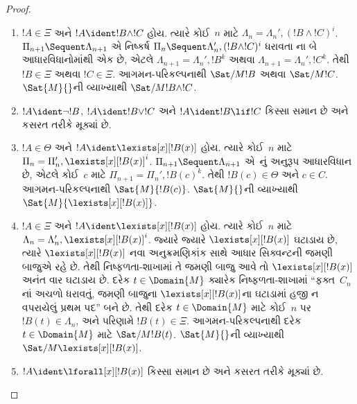 \begin{proof}
\begin{enumerate}
  \item $!A \in \Xi$
  અને
  $!A \ident !B \land !C$
  હોય. ત્યારે
  કોઈ~$n$ માટે
  $\Lambda_n = \Lambda_n', (!B \land !C)^i$.
  $\Pi_{n+1} \Sequent
  \Lambda_{n+1}$
  એ નિષ્કર્ષ
  $\Pi_n \Sequent \Lambda'_n, (!B \land !C)^i$
  ધરાવતા
  \RightR{\land}ના
  બે આધારવિધાનોમાંથી
  એક છે, એટલે
  $\Lambda_{n+1} = \Lambda_n', !B^k$
  અથવા
  $\Lambda_{n+1} = \Lambda_n',
  !C^k$.
  તેથી
  $!B \in \Xi$
  અથવા
  $!C \in \Xi$.
  આગમન-પરિકલ્પનાથી
  $\Sat/{M}{!B}$
  અથવા
  $\Sat/{M}{!C}$.
  $\Sat{M}{}$ની
  વ્યાખ્યાથી
  $\Sat/{M}{!B \land !C}$.
  
  \item
  $!A \ident \lnot !B$,
  $!A \ident !B \lor !C$
  અને
  $!A \ident !B \lif !C$
  કિસ્સા સમાન
  છે અને
  કસરત તરીકે
  મૂક્યાં છે.

  \item $!A \in \Theta$
  અને
  $!A \ident \lexists[x][!B(x)]$
  હોય. ત્યારે
  કોઈ~$n$ માટે
  $\Pi_n = \Pi_n', \lexists[x][!B(x)]^i$.
  $\Pi_{n+1}
  \Sequent \Lambda_{n+1}$
  એ~\LeftR{\lexists}નું
  અનુરૂપ
  આધારવિધાન
  છે, એટલે
  કોઈ~$c$ માટે
  $\Pi_{n+1} = \Pi_n', !B(c)^k$.
  તેથી
  $!B(c) \in \Theta$
  અને
  $c \in C$.
  આગમન-પરિકલ્પનાથી
  $\Sat{M}{!B(c)}$.
  $\Sat{M}{}$ની
  વ્યાખ્યાથી
  $\Sat{M}{\lexists[x][!B(x)]}$.

  \item $!A \in \Xi$
  અને
  $!A \ident \lexists[x][!B(x)]$
  હોય. ત્યારે
  કોઈ~$n$ માટે
  $\Lambda_n = \Lambda_n', \lexists[x][!B(x)]^i$.
  જ્યારે જ્યારે
  $\lexists[x][!B(x)]$
  ઘટાડાય છે,
  ત્યારે
  $\lexists[x][!B(x)]$
  નવા અનુક્રમણિકાંક
  સાથે આધાર
  સિક્વન્ટની
  જમણી બાજુએ
  રહે છે.
  તેથી નિષ્ફળતા-શાખામાં
  તે જમણી બાજુ
  આવે તો
  $\lexists[x][!B(x)]$
  અનંત વાર
  ઘટાડાય છે.
  દરેક
  $t \in
  \Domain{M}$
  ક્યારેક
  નિષ્ફળતા-શાખામાં
  ``ફક્ત~$C_n$નાં
  અચળો ધરાવતું,
  જમણી બાજુના
  $\lexists[x][!B(x)]$ના
  ઘટાડામાં હજી
  ન વપરાયેલું
  પ્રથમ પદ''
  બને છે.
  તેથી દરેક
  $t \in \Domain{M}$
  માટે કોઈ~$n$
  પર
  $!B(t) \in \Lambda_n$,
  અને પરિણામે
  $!B(t) \in \Xi$.
  આગમન-પરિકલ્પનાથી
  દરેક
  $t \in
  \Domain{M}$
  માટે
  $\Sat/{M}{!B(t)}$.
  $\Sat{M}{}$ની
  વ્યાખ્યાથી
  $\Sat/{M}{\lexists[x][!B(x)]}$.

  \item
  $!A \ident \lforall[x][!B(x)]$
  કિસ્સા સમાન
  છે અને
  કસરત તરીકે
  મૂક્યાં છે.
\end{enumerate}
\end{proof}

